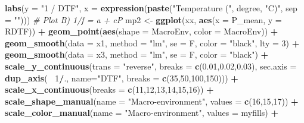 \documentclass[
]{article}
\newenvironment{Shaded}{\begin{snugshade}}{\end{snugshade}}
\newcommand{\CommentTok}[1]{\textcolor[rgb]{0.56,0.35,0.01}{\textit{#1}}}
\newcommand{\DataTypeTok}[1]{\textcolor[rgb]{0.13,0.29,0.53}{#1}}
\newcommand{\DecValTok}[1]{\textcolor[rgb]{0.00,0.00,0.81}{#1}}
\newcommand{\FloatTok}[1]{\textcolor[rgb]{0.00,0.00,0.81}{#1}}
\newcommand{\KeywordTok}[1]{\textcolor[rgb]{0.13,0.29,0.53}{\textbf{#1}}}
\newcommand{\NormalTok}[1]{#1}
\newcommand{\OperatorTok}[1]{\textcolor[rgb]{0.81,0.36,0.00}{\textbf{#1}}}
\newcommand{\StringTok}[1]{\textcolor[rgb]{0.31,0.60,0.02}{#1}}
\begin{document}
\begin{Shaded}
\begin{Highlighting}[]
{{{{{\StringTok{  }\KeywordTok{labs}\NormalTok{(}\DataTypeTok{y =} \StringTok{"1 / DTF"}\NormalTok{, }\DataTypeTok{x =} \KeywordTok{expression}\NormalTok{(}\KeywordTok{paste}\NormalTok{(}\StringTok{"Temperature ("}\NormalTok{, degree, }\StringTok{"C)"}\NormalTok{, }\DataTypeTok{sep =} \StringTok{""}\NormalTok{)))}
\CommentTok{# Plot B) 1/f = a + cP}
\NormalTok{mp2 <-}\StringTok{ }\KeywordTok{ggplot}\NormalTok{(xx, }\KeywordTok{aes}\NormalTok{(}\DataTypeTok{x =}\NormalTok{ P_mean, }\DataTypeTok{y =}\NormalTok{ RDTF)) }\OperatorTok{+}
\StringTok{  }\KeywordTok{geom_point}\NormalTok{(}\KeywordTok{aes}\NormalTok{(}\DataTypeTok{shape =}\NormalTok{ MacroEnv, }\DataTypeTok{color =}\NormalTok{ MacroEnv)) }\OperatorTok{+}
\StringTok{  }\KeywordTok{geom_smooth}\NormalTok{(}\DataTypeTok{data =}\NormalTok{ x1, }\DataTypeTok{method =} \StringTok{"lm"}\NormalTok{, }\DataTypeTok{se =}\NormalTok{ F, }\DataTypeTok{color =} \StringTok{"black"}\NormalTok{, }\DataTypeTok{lty =} \DecValTok{3}\NormalTok{) }\OperatorTok{+}
\StringTok{  }\KeywordTok{geom_smooth}\NormalTok{(}\DataTypeTok{data =}\NormalTok{ x3, }\DataTypeTok{method =} \StringTok{"lm"}\NormalTok{, }\DataTypeTok{se =}\NormalTok{ F, }\DataTypeTok{color =} \StringTok{"black"}\NormalTok{) }\OperatorTok{+}
\StringTok{  }\KeywordTok{scale_y_continuous}\NormalTok{(}\DataTypeTok{trans =} \StringTok{"reverse"}\NormalTok{, }\DataTypeTok{breaks =} \KeywordTok{c}\NormalTok{(}\FloatTok{0.01}\NormalTok{,}\FloatTok{0.02}\NormalTok{,}\FloatTok{0.03}\NormalTok{),}
        \DataTypeTok{sec.axis =} \KeywordTok{dup_axis}\NormalTok{(}\OperatorTok{~}\StringTok{ }\DecValTok{1}\OperatorTok{/}\NormalTok{., }\DataTypeTok{name=}\StringTok{"DTF"}\NormalTok{, }\DataTypeTok{breaks =} \KeywordTok{c}\NormalTok{(}\DecValTok{35}\NormalTok{,}\DecValTok{50}\NormalTok{,}\DecValTok{100}\NormalTok{,}\DecValTok{150}\NormalTok{))) }\OperatorTok{+}
\StringTok{  }\KeywordTok{scale_x_continuous}\NormalTok{(}\DataTypeTok{breaks =} \KeywordTok{c}\NormalTok{(}\DecValTok{11}\NormalTok{,}\DecValTok{12}\NormalTok{,}\DecValTok{13}\NormalTok{,}\DecValTok{14}\NormalTok{,}\DecValTok{15}\NormalTok{,}\DecValTok{16}\NormalTok{)) }\OperatorTok{+}
\StringTok{  }\KeywordTok{scale_shape_manual}\NormalTok{(}\DataTypeTok{name =} \StringTok{"Macro-environment"}\NormalTok{, }\DataTypeTok{values =} \KeywordTok{c}\NormalTok{(}\DecValTok{16}\NormalTok{,}\DecValTok{15}\NormalTok{,}\DecValTok{17}\NormalTok{)) }\OperatorTok{+}
\StringTok{  }\KeywordTok{scale_color_manual}\NormalTok{(}\DataTypeTok{name =} \StringTok{"Macro-environment"}\NormalTok{, }\DataTypeTok{values =}\NormalTok{ myfills) }\OperatorTok{+}
}}}}}
\end{Highlighting}
\end{Shaded}
\end{document}

